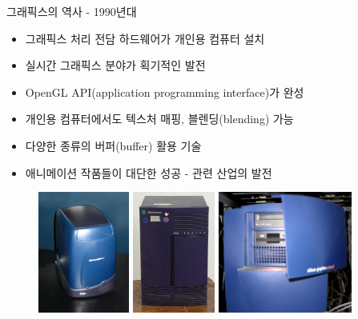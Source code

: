 \documentclass{beamer}
\begin{document}
\begin{frame}{그래픽스의 역사 - 1990년대}

\begin{itemize}
\item 그래픽스 처리 전담 하드웨어가 개인용 컴퓨터 설치
\item 실시간 그래픽스 분야가 획기적인 발전
\item OpenGL API(application programming interface)가 완성
\item 개인용 컴퓨터에서도 텍스처 매핑, 블렌딩(blending) 가능
\item 다양한 종류의 버퍼(buffer) 활용 기술
\item 애니메이션 작품들이 대단한 성공 - 관련 산업의 발전
\end{itemize}

\begin{figure}
    \includegraphics[height=4cm]{OGL_intro/SGI_O2.jpg}
    \includegraphics[height=4cm]{OGL_intro/SGI_Indigo.jpg}
    \includegraphics[height=4cm]{OGL_intro/SGI_Octane.png}
\end{figure}


\end{frame}
\end{document}
